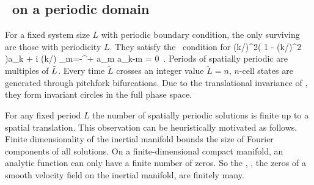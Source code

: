 \subsection{\KSe\ on a periodic domain}
For a fixed system size 
$L$ with periodic boundary condition, the only surviving {\eqva}  are
those with periodicity $L$.
They satisfy 
the \eqv\ condition for 
\beq
(k/)^2\left( 1 - (k/)^2  \right)a_k 
	 + i (k/) \sum_{m=-\infty}^{+\infty} a_m a_{k-m} = 0
\,.
\label{eq:stfks}
\eeq 
Periods of spatially periodic {\eqva} are multiples of $\tilde{L}$.
Every time $\tilde{L}$ crosses an integer value  $\tilde{L}=n$,
$n$-cell states
are generated through pitchfork bifurcations. 
Due to the translational invariance of {\KSe},
they form invariant circles
in the full phase space.

For any fixed period $L$
the number 
of spatially periodic solutions is finite up to a spatial translation.
This observation can be heuristically motivated as follows. 
Finite dimensionality of the inertial manifold
bounds the size of Fourier components of all solutions.
On a finite-dimensional compact manifold,
an analytic function can only have a finite number
of zeros. So the {\eqva}, {\ie},
the zeros of a smooth velocity field on
the inertial manifold, are finitely many.

